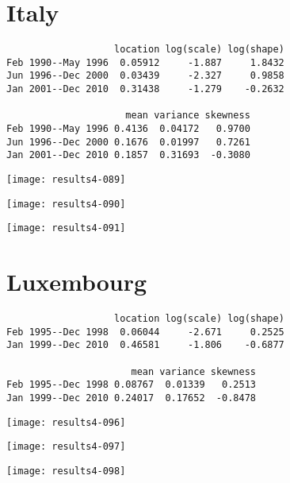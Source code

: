 \documentclass[a4paper]{article}
\begin{document}
\newpage

\section*{Italy}


\begin{verbatim}
                   location log(scale) log(shape)
Feb 1990--May 1996  0.05912     -1.887     1.8432
Jun 1996--Dec 2000  0.03439     -2.327     0.9858
Jan 2001--Dec 2010  0.31438     -1.279    -0.2632

                     mean variance skewness
Feb 1990--May 1996 0.4136  0.04172   0.9700
Jun 1996--Dec 2000 0.1676  0.01997   0.7261
Jan 2001--Dec 2010 0.1857  0.31693  -0.3080

\end{verbatim}

\begin{center}
\texttt{[image: results4-089]}

\texttt{[image: results4-090]}

\texttt{[image: results4-091]}
\end{center}


\newpage

\section*{Luxembourg}


\begin{verbatim}
                   location log(scale) log(shape)
Feb 1995--Dec 1998  0.06044     -2.671     0.2525
Jan 1999--Dec 2010  0.46581     -1.806    -0.6877

                      mean variance skewness
Feb 1995--Dec 1998 0.08767  0.01339   0.2513
Jan 1999--Dec 2010 0.24017  0.17652  -0.8478

\end{verbatim}

\begin{center}
\texttt{[image: results4-096]}

\texttt{[image: results4-097]}

\texttt{[image: results4-098]}
\end{center}
\end{document}
